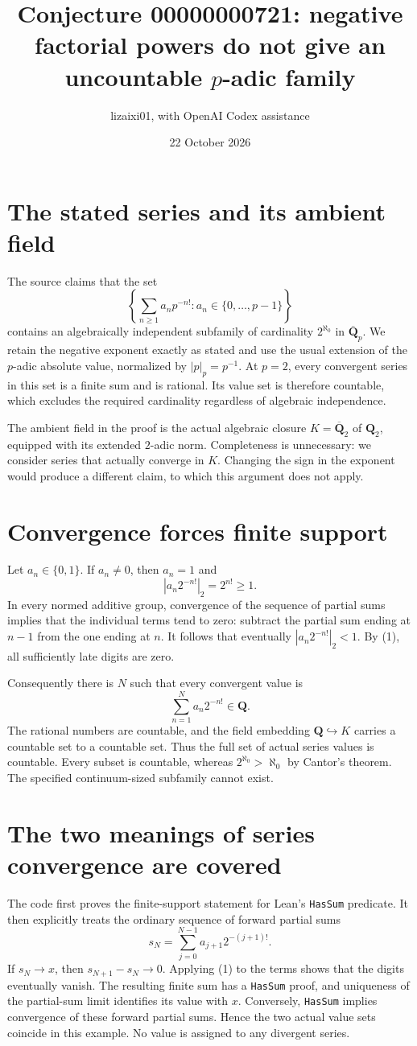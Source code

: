 \documentclass[11pt]{article}
\title{Conjecture 00000000721: negative factorial powers do not give an uncountable $p$-adic family}
\author{lizaixi01, with OpenAI Codex assistance}
\date{22 October 2026}
\begin{document}
\maketitle
\section{The stated series and its ambient field}
The source claims that the set
\[
 \left\{\sum_{n\geq1}a_n p^{-n!}:a_n\in\{0,\ldots,p-1\}\right\}
\]
contains an algebraically independent subfamily of cardinality
$2^{\aleph_0}$ in $\overline{\mathbf Q}_p$.
We retain the negative exponent exactly as stated and use the usual
extension of the $p$-adic absolute value, normalized by $|p|_p=p^{-1}$.
At $p=2$, every convergent series in this set is a finite sum and is
rational. Its value set is therefore countable, which excludes the
required cardinality regardless of algebraic independence.

The ambient field in the proof is the actual algebraic closure
$K=\overline{\mathbf Q}_2$ of $\mathbf Q_2$, equipped with its extended
$2$-adic norm. Completeness is unnecessary: we consider series that
actually converge in $K$. Changing the sign in the exponent would
produce a different claim, to which this argument does not apply.

\section{Convergence forces finite support}
Let $a_n\in\{0,1\}$. If $a_n\ne0$, then $a_n=1$ and
\[
 |a_n2^{-n!}|_2=2^{n!}\geq1.                         \tag{1}
\]
In every normed additive group, convergence of the sequence of partial
sums implies that the individual terms tend to zero: subtract the
partial sum ending at $n-1$ from the one ending at $n$.
It follows that eventually $|a_n2^{-n!}|_2<1$.
By (1), all sufficiently late digits are zero.

Consequently there is $N$ such that every convergent value is
\[
 \sum_{n=1}^{N} a_n 2^{-n!}\in\mathbf Q.
\]
The rational numbers are countable, and the field embedding
$\mathbf Q\hookrightarrow K$ carries a countable set to a countable
set. Thus the full set of actual series values is countable. Every
subset is countable, whereas $2^{\aleph_0}>\aleph_0$ by Cantor's theorem.
The specified continuum-sized subfamily cannot exist.

\section{The two meanings of series convergence are covered}
The code first proves the finite-support statement for Lean's
\texttt{HasSum} predicate. It then explicitly treats the ordinary
sequence of forward partial sums
\[
 s_N=\sum_{j=0}^{N-1} a_{j+1}2^{-(j+1)!}.
\]
If $s_N\to x$, then $s_{N+1}-s_N\to0$. Applying (1) to the terms shows
that the digits eventually vanish. The resulting finite sum has a
\texttt{HasSum} proof, and uniqueness of the partial-sum limit identifies
its value with $x$. Conversely, \texttt{HasSum} implies convergence of
these forward partial sums. Hence the two actual value sets coincide
in this example. No value is assigned to any divergent series.
\end{document}
